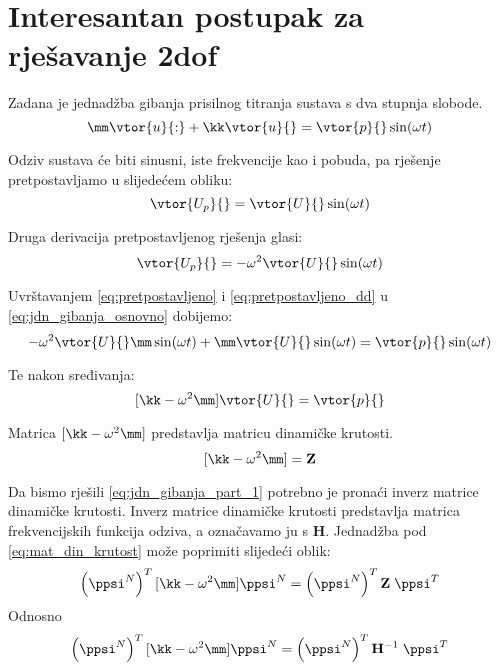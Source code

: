 \section{Interesantan postupak za rješavanje 2dof}
Zadana je jednadžba gibanja prisilnog titranja sustava s dva stupnja slobode.
\begin{equation}\label{eq:jdn_gibanja_osnovno}
    \mm\vtor{u}{:}+\kk\vtor{u}{}=\vtor{p}{}\sin(\omega t)
\end{equation}

Odziv sustava će biti sinusni, iste frekvencije kao i pobuda, pa rješenje
pretpostavljamo u slijedećem obliku:
\begin{equation}\label{eq:pretpostavljeno}
    \vtor{U_p}{}=\vtor{U}{}\sin(\omega t)
\end{equation}

Druga derivacija pretpostavljenog rješenja glasi:
\begin{equation}\label{eq:pretpostavljeno_dd}
    \vtor{U_p}{}=-\omega^2\vtor{U}{}\sin(\omega t)
\end{equation}

Uvrštavanjem \eqref{eq:pretpostavljeno} i \eqref{eq:pretpostavljeno_dd} u
\eqref{eq:jdn_gibanja_osnovno} dobijemo:
\begin{equation}
    -\omega^2\vtor{U}{}\mm\sin(\omega t) + \mm\vtor{U}{}\sin(\omega t) = \vtor{p}{}\sin(\omega t)
\end{equation}

Te nakon sređivanja:
\begin{equation}\label{eq:jdn_gibanja_part_1}
    [\kk-\omega^2\mm]\vtor{U}{}=\vtor{p}{}
\end{equation}

Matrica $[\kk-\omega^2\mm]$ predstavlja matricu dinamičke krutosti.
\begin{equation}\label{eq:mat_din_krutost}
    [\kk-\omega^2\mm]=\mathbf{Z}
\end{equation}

Da bismo rješili \eqref{eq:jdn_gibanja_part_1} potrebno je pronaći inverz matrice
dinamičke krutosti. Inverz matrice dinamičke krutosti predstavlja matrica
frekvencijskih funkcija odziva, a označavamo ju s $\mathbf{H}$. Jednadžba pod 
\eqref{eq:mat_din_krutost} može poprimiti slijedeći oblik:
\begin{equation}
    \left(\ppsi^N\right)^T[\kk-\omega^2\mm]\ppsi^N
    =
    \left(\ppsi^N\right)^T\mathbf{Z}\;\ppsi^T
\end{equation}
Odnosno
\begin{equation}
     \left(\ppsi^N\right)^T[\kk-\omega^2\mm]\ppsi^N
    =
    \left(\ppsi^N\right)^T\mathbf{H}^{-1}\;\ppsi^T
\end{equation}

